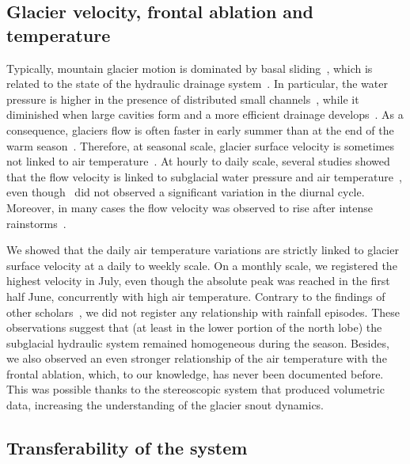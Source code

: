 \subsection{Glacier velocity, frontal ablation and
  temperature}\label{sec:4:discuss_velocity_ablation_temperature}

Typically, mountain glacier motion is dominated by basal sliding~\citep{willis1995intra},
which is related to the state of the hydraulic drainage
system~\citep{vincent2016sliding}.
In particular, the water pressure is higher in the presence of distributed small
channels~\citep{pimentel2011numerical}, while it diminished when large cavities form and
a more
efficient drainage develops~\citep{nienow2005hydrological}.
As a consequence, glaciers flow is often faster in early summer than at the end of the
warm season~\citep{sanders2018variations,vincent2016sliding}.
Therefore, at seasonal scale, glacier surface velocity is sometimes not linked to air
temperature~\citep{sanders2018variations}.
At hourly to daily scale, several studies showed that the flow velocity is linked to
subglacial water pressure \citep{sugiyama2010surface} and air
temperature~\citep{liu2019diurnal},
even though~\cite{allstadt2015observations} did not observed a significant variation in
the diurnal cycle.
Moreover, in many cases the flow velocity was observed to rise after intense
rainstorms~\citep{benoit2015multi,horgan2015glacier,sugiyama2010surface}.

We showed that the daily air temperature variations are strictly linked to glacier
surface velocity at a daily to weekly scale.
On a monthly scale, we registered the highest velocity in July, even though the absolute
peak was reached in the first half June, concurrently with high air temperature.
Contrary to the findings of other
scholars~\citep{benoit2015multi,horgan2015glacier,sugiyama2010surface}, we did not
register any relationship with rainfall episodes.
These observations suggest that (at least in the lower portion of the north lobe) the
subglacial hydraulic system remained homogeneous during the season.
Besides, we also observed an even stronger relationship of the air temperature with the
frontal ablation, which, to our knowledge, has never been documented before.
This was possible thanks to the stereoscopic system that produced volumetric data,
increasing the understanding of the glacier snout dynamics.

\subsection{Transferability of the system}\label{sec:4:transferability}

